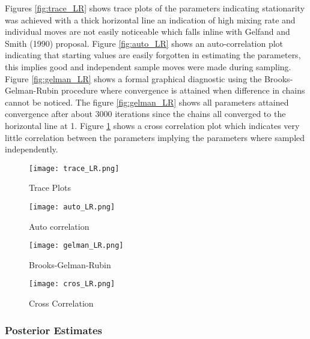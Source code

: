 \documentclass[11pt]{article}
\begin{document}
Figures \ref{fig:trace_LR} shows trace plots of the parameters indicating stationarity was achieved with a thick horizontal line an indication of high mixing rate and individual moves are not easily noticeable which falls inline with Gelfand and Smith (1990) proposal. Figure \ref{fig:auto_LR} shows an auto-correlation plot indicating that starting values are easily forgotten in estimating the parameters, this implies good and independent sample moves were made during sampling. Figure \ref{fig:gelman_LR} shows a formal graphical diagnostic using the Brooks-Gelman-Rubin procedure where convergence is attained when difference in chains cannot be noticed. The figure \ref{fig:gelman_LR} shows all parameters attained convergence after about 3000 iterations since the chains all converged to the horizontal line at 1. Figure \ref{fig:cros_LR} shows a cross correlation plot which indicates very little correlation between the parameters implying the parameters where sampled independently.
    \begin{figure}[H]
  \begin{minipage}[b]{0.4\textwidth}
    \texttt{[image: trace\_LR.png]}
    \caption{Trace Plots}
    \label{fig:trace_LR}
  \end{minipage}
  \hfill
  \begin{minipage}[b]{0.45\textwidth}
    \texttt{[image: auto\_LR.png]}
    \caption{Auto correlation}
    \label{fig:auto_LR}
  \end{minipage}
    \hfill
  \begin{minipage}[b]{0.45\textwidth}
    \texttt{[image: gelman\_LR.png]}
    \caption{Brooks-Gelman-Rubin}
    \label{fig:gelman_LR}
  \end{minipage}
      \hfill
  \begin{minipage}[b]{0.45\textwidth}
    \texttt{[image: cros\_LR.png]}
    \caption{Cross Correlation}
    \label{fig:cros_LR}
  \end{minipage}
\end{figure}


\subsubsection{Posterior Estimates}

\end{document}
